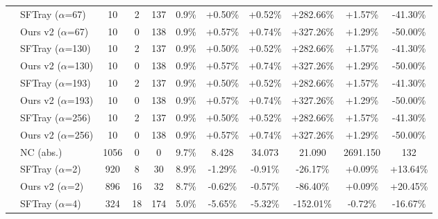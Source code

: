 \begin{table}[t]
{\begin{tabular}{ll|cccc|ccc|cc}
\addlinespace[0.3em]

 & SFTray ($\alpha$=67) & 10 & 2 & 137 & 0.9\% & +0.50\% & +0.52\% & +282.66\% & +1.57\% & -41.30\% \\

 & Ours v2 ($\alpha$=67) & 10 & 0 & 138 & 0.9\% & +0.57\% & +0.74\% & +327.26\% & +1.29\% & -50.00\% \\

\addlinespace[0.3em]

 & SFTray ($\alpha$=130) & 10 & 2 & 137 & 0.9\% & +0.50\% & +0.52\% & +282.66\% & +1.57\% & -41.30\% \\

 & Ours v2 ($\alpha$=130) & 10 & 0 & 138 & 0.9\% & +0.57\% & +0.74\% & +327.26\% & +1.29\% & -50.00\% \\

\addlinespace[0.3em]

 & SFTray ($\alpha$=193) & 10 & 2 & 137 & 0.9\% & +0.50\% & +0.52\% & +282.66\% & +1.57\% & -41.30\% \\

 & Ours v2 ($\alpha$=193) & 10 & 0 & 138 & 0.9\% & +0.57\% & +0.74\% & +327.26\% & +1.29\% & -50.00\% \\

\addlinespace[0.3em]

 & SFTray ($\alpha$=256) & 10 & 2 & 137 & 0.9\% & +0.50\% & +0.52\% & +282.66\% & +1.57\% & -41.30\% \\

 & Ours v2 ($\alpha$=256) & 10 & 0 & 138 & 0.9\% & +0.57\% & +0.74\% & +327.26\% & +1.29\% & -50.00\% \\

\addlinespace[0.3em]

\midrule

\multirow{25}{*}{riscv32i} & NC (abs.) & 1056 & 0 & 0 & 9.7\% & 8.428 & 34.073 & 21.090 & 2691.150 & 132 \\

\addlinespace[0.4em]

 & SFTray ($\alpha$=2) & 920 & 8 & 30 & 8.9\% & -1.29\% & -0.91\% & -26.17\% & +0.09\% & +13.64\% \\

 & Ours v2 ($\alpha$=2) & 896 & 16 & 32 & 8.7\% & -0.62\% & -0.57\% & -86.40\% & +0.09\% & +20.45\% \\

\addlinespace[0.3em]

 & SFTray ($\alpha$=4) & 324 & 18 & 174 & 5.0\% & -5.65\% & -5.32\% & -152.01\% & -0.72\% & -16.67\% \\


\end{tabular}}
\end{table}
